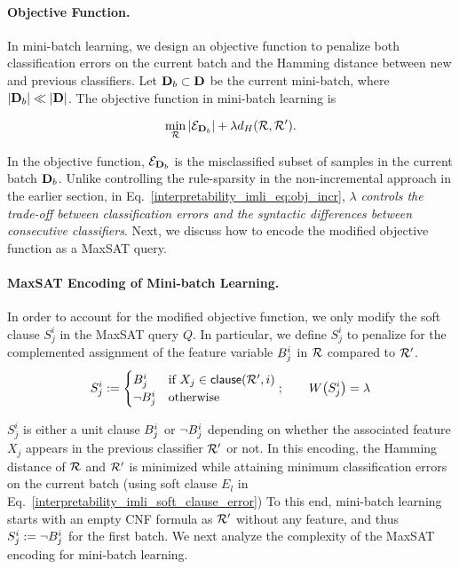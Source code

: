 \paragraph{Objective Function.}
\label{interpretability_imli_sec:obj_incremental}
In mini-batch learning, we design an objective function to penalize both classification errors on the current batch and the Hamming distance between new and previous classifiers. Let $ \mathbf{D}_b \subset \mathbf{D} $ be the current mini-batch, where $ |\mathbf{D}_b| \ll |\mathbf{D}| $. The objective function in mini-batch learning is




\begin{align}
\label{interpretability_imli_eq:obj_incr}
\min_{{\mathcal{R}}} |\mathcal{E}_{\mathbf{D}_b}|+\lambda d_{H}({\mathcal{R}}, {\mathcal{R}}').
\end{align}

In the objective function, $ \mathcal{E}_{\mathbf{D}_b} $ is the misclassified subset of samples in the current batch $ \mathbf{D}_b $. Unlike controlling the rule-sparsity in the non-incremental approach in the earlier section, in Eq.~\eqref{interpretability_imli_eq:obj_incr}, $ \lambda $ \emph{controls the trade-off between classification errors and the syntactic differences between consecutive classifiers}. Next, we discuss how to encode the modified objective function as a MaxSAT query. 
 

\paragraph{MaxSAT Encoding of Mini-batch Learning.}
\label{interpretability_imli_sec:encoding_incremental}
In order to account for the modified objective function, we only modify the soft clause $ S_j^i $ in the MaxSAT query $ Q $. In particular, we define $ S_j^i $ to penalize for the complemented assignment  of the feature variable $ B_j^i $ in $ {\mathcal{R}} $ compared to $ {\mathcal{R}}' $.
\[
S_j^i:=
\begin{cases}
B_j^i& \text{if }  X_j \in  \mathsf{clause}({\mathcal{R}}',i)  \\
\neg B_j^i & \text{otherwise}
\end{cases};\qquad W \! \left( S_j^i \right)=\lambda
\]

$ S_j^i $ is either a unit clause $ B_j^i $ or $ \neg B_j^i $ depending on whether the associated feature $ X_j $ appears in the previous classifier $ {\mathcal{R}}' $ or not. In this encoding, the Hamming distance of $ {\mathcal{R}} $ and $ {\mathcal{R}}' $ is minimized while attaining minimum classification errors on the current batch (using soft clause $ E_l $ in Eq.~\eqref{interpretability_imli_soft_clause_error}) To this end,  mini-batch learning starts with an empty CNF formula as $ {\mathcal{R}}' $ without any feature, and thus $ S_j^i := \neg B_j^i $ for the first batch. We next analyze the complexity of the MaxSAT encoding for mini-batch learning. 


